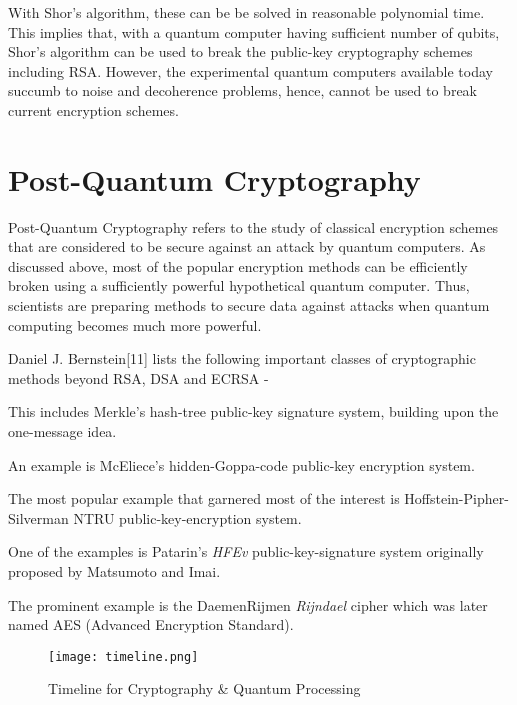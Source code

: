With Shor's algorithm, these can be be solved in reasonable polynomial time. This implies that, with a quantum computer having sufficient number of qubits, Shor's algorithm can be used to break the public-key cryptography schemes including RSA. However, the experimental quantum computers available today succumb to noise and decoherence problems, hence, cannot be used to break current encryption schemes.

\section{Post-Quantum Cryptography}
Post-Quantum Cryptography refers to the study of classical encryption schemes that are considered to be secure against an attack by quantum computers. As discussed above, most of the popular encryption methods can be efficiently broken using a sufficiently powerful hypothetical quantum computer. Thus, scientists are preparing methods to secure data against attacks when quantum computing becomes much more powerful.

Daniel J. Bernstein[11] lists the following important classes of cryptographic methods beyond RSA, DSA and ECRSA -
\begin{description}[align=left, style=multiline,leftmargin=4 cm]
\item [Hash-based - ] This includes Merkle's hash-tree public-key signature system, building upon the one-message idea.
\item [Code-based - ] An example is McEliece's hidden-Goppa-code public-key encryption system.
\item [Lattice-based - ] The most popular example that garnered most of the interest is Hoffstein-Pipher-Silverman NTRU public-key-encryption system.
\item [Multivariate quadratic equation based- ] One of the examples is Patarin's {\em HFEv} public-key-signature system originally proposed by Matsumoto and Imai.\\
\item [Secret-key based - ] The prominent example is the DaemenRijmen
{\em Rijndael} cipher which was later named AES (Advanced Encryption Standard).
\end{description}

\begin{figure}[H]
\centering
\texttt{[image: timeline.png]}
\caption{Timeline for Cryptography \& Quantum Processing}\label{fig:timeline}
\end{figure}


